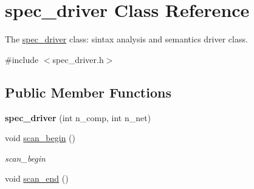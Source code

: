 \hypertarget{classspec__driver}{}\section{spec\+\_\+driver Class Reference}
\label{classspec__driver}


The \hyperlink{classspec__driver}{spec\+\_\+driver} class\+: sintax analysis and semantics driver class.  




{\ttfamily \#include $<$spec\+\_\+driver.\+h$>$}

\subsection*{Public Member Functions}
\begin{DoxyCompactItemize}
\item 
{\bfseries spec\+\_\+driver} (int n\+\_\+comp, int n\+\_\+net)\hypertarget{classspec__driver_a501cafe1beec7fb6bdf123fbee1f64fd}{}\label{classspec__driver_a501cafe1beec7fb6bdf123fbee1f64fd}

\item 
void \hyperlink{classspec__driver_a1dec95b6431143ef6eb2d7072769ccd7}{scan\+\_\+begin} ()\hypertarget{classspec__driver_a1dec95b6431143ef6eb2d7072769ccd7}{}\label{classspec__driver_a1dec95b6431143ef6eb2d7072769ccd7}

\begin{DoxyCompactList}\small\item\em scan\+\_\+begin \end{DoxyCompactList}\item 
void \hyperlink{classspec__driver_a2fdbda19869304c97c249af047450972}{scan\+\_\+end} ()\hypertarget{classspec__driver_a2fdbda19869304c97c249af047450972}{}\label{classspec__driver_a2fdbda19869304c97c249af047450972}


\end{DoxyCompactItemize}
